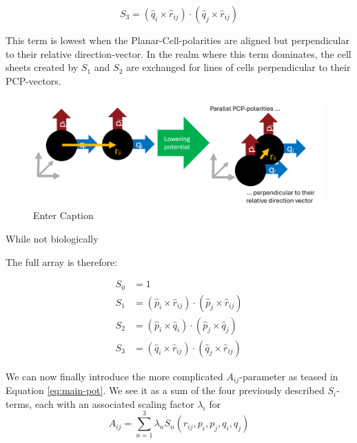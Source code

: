 \begin{equation*}
    S_3=\left(\hat{q}_i \times \hat{r}_{i j}\right) \cdot\left(\hat{q}_j \times \hat{r}_{i j}\right)
\end{equation*}

This term is lowest when the Planar-Cell-polarities are aligned but perpendicular to their relative direction-vector. In the realm where this term dominates, the cell sheets created by $S_1$ and $S_2$ are exchanged for lines of cells perpendicular to their PCP-vectors. 
\begin{figure}[H]
    \centering
    \includegraphics[width=1\linewidth]{chapters//Theory//figures/explainS3.png}
    \caption{Enter Caption}
    \label{fig:enter-label}
\end{figure}

While not biologically 

The full array is therefore:

\begin{subequations}
\begin{align}
S_0&=1\label{eq:s0}\\
S_1&=\left(\hat{p}_i \times \hat{r}_{i j}\right) \cdot\left(\hat{p}_j \times \hat{r}_{i j}\right)\label{eq:s1}\\
S_2&=\left(\hat{p}_i \times \hat{q}_{i}\right) \cdot\left(\hat{p}_j \times \hat{q}_{j}\right)\label{eq:s2}\\
S_3&=\left(\hat{q}_i \times \hat{r}_{i j}\right) \cdot\left(\hat{q}_j \times \hat{r}_{i j}\right)\label{eq:s3}
\end{align}
\end{subequations}


We can now finally introduce the more complicated $A_{ij}$-parameter as teased in Equation \ref{eq:main-pot}. We see it as a sum of the four previously described $S_i$-terms, each with an associated scaling factor $\lambda_i$ for  
\begin{equation}
    A_{ij}=\sum_{n=1}^{3}\lambda_n  S_n(r_{ij}, p_i, p_j, q_i, q_j)
\end{equation}


